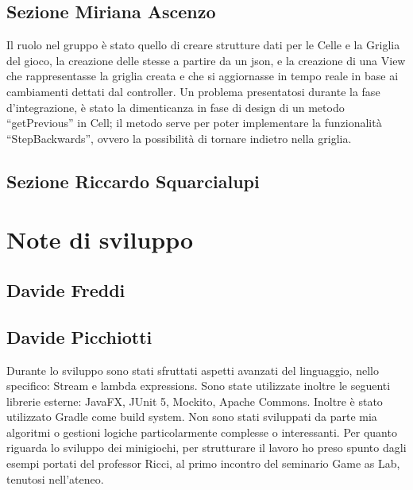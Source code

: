 \documentclass[a4paper,12pt]{report}
\begin{document}
	\subsection{Sezione Miriana Ascenzo}

	Il ruolo nel gruppo è stato quello di creare strutture dati per le Celle e la Griglia del gioco, la creazione delle stesse a partire da un json, e la creazione di una View che rappresentasse la griglia creata e che si aggiornasse in tempo reale in base ai cambiamenti dettati dal controller.
	Un problema presentatosi durante la fase d’integrazione, è stato la dimenticanza in fase di design di un metodo “getPrevious” in Cell; il metodo serve per poter implementare la funzionalità “StepBackwards”, ovvero la possibilità di tornare indietro nella griglia.

	\subsection{Sezione Riccardo Squarcialupi}


	\section{Note di sviluppo}

	\subsection{Davide Freddi}
	\subsection{Davide Picchiotti}

    Durante lo sviluppo sono stati sfruttati aspetti avanzati del linguaggio, nello specifico: Stream e lambda expressions.\newline
    Sono state utilizzate inoltre le seguenti librerie esterne: JavaFX, JUnit 5, Mockito, Apache Commons.\newline
    Inoltre è stato utilizzato Gradle come build system.\newline
    Non sono stati sviluppati da parte mia algoritmi o gestioni logiche particolarmente complesse o interessanti.\newline
    Per quanto riguarda lo sviluppo dei minigiochi, per strutturare il lavoro ho preso spunto dagli esempi portati del professor Ricci,
    al primo incontro del seminario Game as Lab, tenutosi nell'ateneo.\newline
\end{document}

